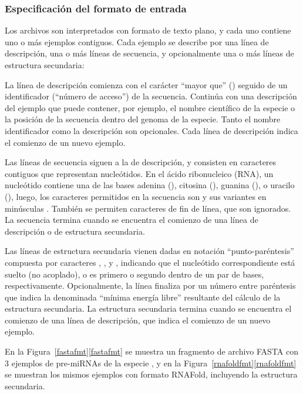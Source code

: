 %
%
\subsubsection{Especificación del formato de entrada}
%
Los archivos son interpretados con formato de texto plano, y cada uno
contiene uno o más ejemplos contiguos.
Cada ejemplo se describe por una línea de descripción, una o más
líneas de secuencia, y opcionalmente una o más líneas de estructura
secundaria:

La línea de descripción comienza con el carácter ``mayor que''
(\mono{>}) seguido de un identificador (``número de acceso'') de la
secuencia. Continúa con una descripción del ejemplo que puede
contener, por ejemplo, el nombre científico de la especie o la
posición de la secuencia dentro del genoma de la especie. Tanto el
nombre identificador como la descripción son opcionales.
Cada línea de descripción indica el comienzo de un nuevo ejemplo.

Las líneas de secuencia siguen a la de descripción, y consisten en
caracteres contiguos que representan nucleótidos. En el ácido
ribonucleico (RNA), un nucleótido contiene una de las bases adenina
(), citosina (), guanina (), o uracilo
(), luego, los caracteres permitidos en la secuencia son
 y sus variantes en minúsculas . También se
permiten caracteres de fin de línea, que son ignorados. La secuencia
termina cuando se encuentra el comienzo de una línea de descripción o
de estructura secundaria.

Las líneas de estructura secundaria vienen dadas en notación
``punto-paréntesis'' compuesta por caracteres , \mono{(}, y
\mono{)}, indicando que el nucleótido correspondiente está suelto (no
acoplado), o es primero o segundo dentro de un par de bases,
respectivamente.  Opcionalmente, la línea finaliza por un número entre
paréntesis que indica la denominada ``mínima energía libre''
resultante del cálculo de la estructura secundaria. La estructura
secundaria termina cuando se encuentra el comienzo de una línea de
descripción, que indica el comienzo de un nuevo ejemplo.

En la \iflatexml{}Figura~\ref{fastafmt}\else\autoref{fastafmt}\fi{} se
muestra un fragmento de archivo FASTA con 3 ejemplos de pre-miRNAs de
la especie , y en la
\iflatexml{}Figura~\ref{rnafoldfmt}\else\autoref{rnafoldfmt}\fi{} se
muestran los mismos ejemplos con formato RNAFold, incluyendo la
estructura secundaria.
